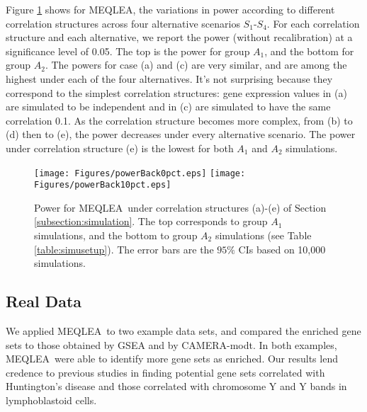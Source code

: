 \documentclass[useAMS,usenatbib, galley]{biom}
\newcommand{\OurMethod}{MEQLEA}
\newcommand{\aaCase}{a}
\newcommand{\aCase}{b}
\newcommand{\cCase}{c}
\newcommand{\eCase}{d}
\newcommand{\fCase}{e}
\newcommand{\CMT}{CAMERA-modt}
\begin{document}
	
	
	Figure \ref{fig:power} shows for \OurMethod, the variations in power according to different correlation structures across four alternative scenarios $S_1$-$S_4$. For each correlation structure and each alternative, we report the power (without recalibration) at a significance level of 0.05. The top is the power for group $A_1$, and the bottom for group $A_2$.  The powers for case (\aaCase) and (\cCase) are very similar, and are among the highest under each of the four alternatives. It's not surprising because they correspond to the simplest correlation structures: gene expression values in (\aaCase) are simulated to be independent and in (\cCase) are simulated to have the same correlation 0.1. As the correlation structure becomes more complex, from (\aCase) to (\eCase) then to (\fCase), the power decreases under every alternative scenario. The power under correlation structure (\fCase) is the lowest for both $A_1$ and $A_2$ simulations.%
	
\begin{figure}
	\begin{center}
		\texttt{[image: Figures/powerBack0pct.eps]}
		\texttt{[image: Figures/powerBack10pct.eps]}
	\end{center} 
		\caption{Power for \OurMethod~under correlation structures (\aaCase)-(\fCase) of Section \ref{subsection:simulation}. The top corresponds to group $A_1$ simulations, and the bottom to group $A_2$ simulations (see Table \ref{table:simusetup}). The error bars are the $95\%$ CIs based on 10,000 simulations. }\label{fig:power}
\end{figure} 
	
	\subsection{Real Data}\label{section:realdata}
	We applied \OurMethod~to two example data sets, and compared the enriched gene sets to those obtained by GSEA and by \CMT. In both examples, \OurMethod~were able to identify more gene sets as enriched. Our results lend credence to previous studies in finding potential gene sets correlated with Huntington's disease and those correlated with chromosome Y and Y bands in lymphoblastoid cells.  
	
\end{document}
